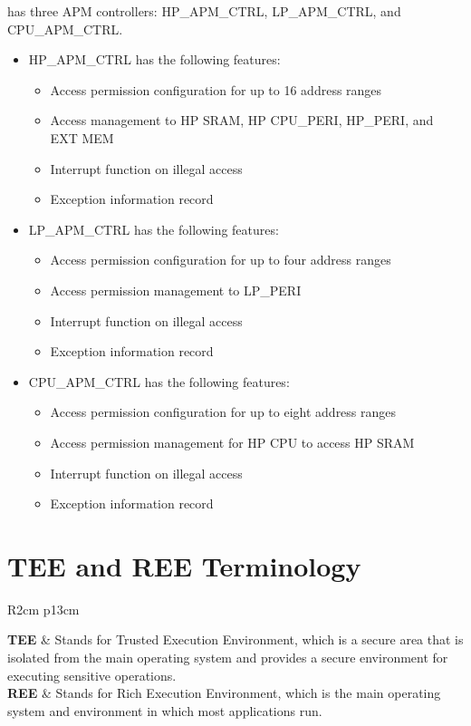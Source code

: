 \documentclass[main\_\_EN.tex]{subfiles}
\begin{document}
\chipname{} has three APM controllers: HP\_APM\_CTRL, LP\_APM\_CTRL, and CPU\_APM\_CTRL.

\begin{itemize}
    \item HP\_APM\_CTRL has the following features:
        \begin{itemize}
        \item Access permission configuration for up to 16 address ranges
        \item Access management to HP SRAM, HP CPU\_PERI, HP\_PERI, and EXT MEM
        \item Interrupt function on illegal access
        \item Exception information record
        \end{itemize}
    \item LP\_APM\_CTRL has the following features:
        \begin{itemize}
        \item Access permission configuration for up to four address ranges
        \item Access permission management to LP\_PERI
        \item Interrupt function on illegal access
        \item Exception information record
        \end{itemize}
    \item CPU\_APM\_CTRL has the following features:
        \begin{itemize}
        \item Access permission configuration for up to eight address ranges
        \item Access permission management for HP CPU to access HP SRAM
        \item Interrupt function on illegal access
        \item Exception information record
        \end{itemize}
\end{itemize}

\section{TEE and REE Terminology}

\begin{longtable}[L]{ R{2cm} p{13cm} }

\textbf{TEE} & Stands for Trusted Execution Environment, which is a secure area that is isolated from the main operating system and provides a secure environment for executing sensitive operations. \\

\textbf{REE} & Stands for Rich Execution Environment, which is the main operating system and environment in which most applications run.
\end{longtable}
\end{document}
